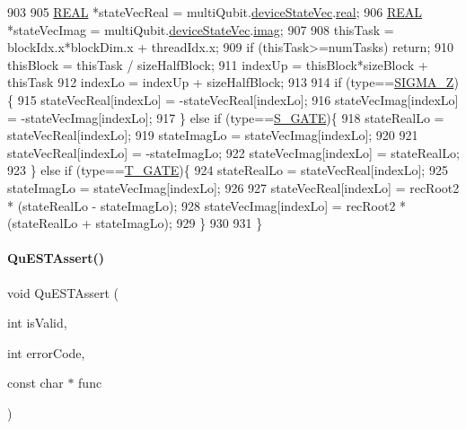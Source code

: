 \begin{DoxyCode}
903 
905     \mbox{\hyperlink{QuEST__precision_8h_a4b654506f18b8bfd61ad2a29a7e38c25}{REAL}} *stateVecReal = multiQubit.\mbox{\hyperlink{structMultiQubit_a59ac613486a41b8c9a4b6e79cc8d2cc3}{deviceStateVec}}.\mbox{\hyperlink{structComplexArray_a4195cac6c784ea1b6271f1c7dba1548a}{real}};
906     \mbox{\hyperlink{QuEST__precision_8h_a4b654506f18b8bfd61ad2a29a7e38c25}{REAL}} *stateVecImag = multiQubit.\mbox{\hyperlink{structMultiQubit_a59ac613486a41b8c9a4b6e79cc8d2cc3}{deviceStateVec}}.\mbox{\hyperlink{structComplexArray_a79dde47c7ae530c79cebfdf57b225968}{imag}};
907 
908     thisTask = blockIdx.x*blockDim.x + threadIdx.x;
909     \textcolor{keywordflow}{if} (thisTask>=numTasks) \textcolor{keywordflow}{return};
910     thisBlock   = thisTask / sizeHalfBlock;
911     indexUp     = thisBlock*sizeBlock + thisTask%
912     indexLo     = indexUp + sizeHalfBlock;
913 
914     \textcolor{keywordflow}{if} (type==\mbox{\hyperlink{QuEST_8h_a5739021c733cecc49647956b2f7338eaa754922d1e1846a1961ff2bf163483dac}{SIGMA\_Z}})\{
915         stateVecReal[indexLo] = -stateVecReal[indexLo];
916         stateVecImag[indexLo] = -stateVecImag[indexLo];
917     \} \textcolor{keywordflow}{else} \textcolor{keywordflow}{if} (type==\mbox{\hyperlink{QuEST_8h_a5739021c733cecc49647956b2f7338eaa06e60f80fa80cce271793d6d31bcc21f}{S\_GATE}})\{
918         stateRealLo = stateVecReal[indexLo];
919         stateImagLo = stateVecImag[indexLo];
920 
921         stateVecReal[indexLo] = -stateImagLo;
922         stateVecImag[indexLo] = stateRealLo;
923     \} \textcolor{keywordflow}{else} \textcolor{keywordflow}{if} (type==\mbox{\hyperlink{QuEST_8h_a5739021c733cecc49647956b2f7338eaa614d07d597a8e320cc556bc0e652e4ab}{T\_GATE}})\{
924         stateRealLo = stateVecReal[indexLo];
925         stateImagLo = stateVecImag[indexLo];
926 
927         stateVecReal[indexLo] = recRoot2 * (stateRealLo - stateImagLo);
928         stateVecImag[indexLo] = recRoot2 * (stateRealLo + stateImagLo);
929     \}
930 
931 \}
\end{DoxyCode}
\mbox{\label{QuEST__env__localGPU_8cu_a3587b9d533e633ccf1abf9ad2ce45d8d}} 
\paragraph{\texorpdfstring{Qu\+E\+S\+T\+Assert()}{QuESTAssert()}}
{\footnotesize\ttfamily void Qu\+E\+S\+T\+Assert (\begin{DoxyParamCaption}\item[{int}]{is\+Valid,  }\item[{int}]{error\+Code,  }\item[{const char $\ast$}]{func }\end{DoxyParamCaption})}



